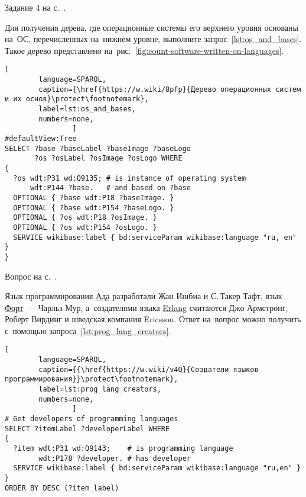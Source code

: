 \newpage
\begin{task}
\label{answer:os_and_bases}
    \AnswerBackref Задание 4 на с.~\pageref{tasks:operating_system_tasks}.

    Для получения дерева, где операционные системы его верхнего уровня  
    основаны на~ОС, перечисленных на~нижнем уровне, выполните запрос~\ref{lst:os_and_bases}. 
    Такое дерево представлено на~рис.~\ref{fig:count-software-written-on-languages}.

\begin{lstlisting}[ 
        language=SPARQL, 
        caption={\href{https://w.wiki/8pfp}{Дерево операционных систем и их основ}\protect\footnotemark},
        label=lst:os_and_bases,
        numbers=none,
	            ]
#defaultView:Tree
SELECT ?base ?baseLabel ?baseImage ?baseLogo
       ?os ?osLabel ?osImage ?osLogo WHERE 
{
  ?os wdt:P31 wd:Q9135; # is instance of operating system
      wdt:P144 ?base.   # and based on ?base
  OPTIONAL { ?base wdt:P18 ?baseImage. }
  OPTIONAL { ?base wdt:P154 ?baseLogo. }
  OPTIONAL { ?os wdt:P18 ?osImage. }
  OPTIONAL { ?os wdt:P154 ?osLogo. }
  SERVICE wikibase:label { bd:serviceParam wikibase:language "ru, en" }
}
\end{lstlisting}
\end{task}




\hfil{}\hfil%

\begin{task}
    \label{answer:prog_lang_1}
    \AnswerBackref Вопрос на с.~\pageref{question:prog_lang_1}.

    Язык программирования \href{https://ru.wikipedia.org/?curid=4500}{Ада} 
    разработали Жан Ишбиа и С.\,Такер Тафт, 
    язык \href{https://ru.wikipedia.org/?curid=11379}{Форт}~--- Чарльз Мур, 
    а~создателями языка \href{https://ru.wikipedia.org/wiki/Erlang}{Erlang} считаются Джо Армстронг, Роберт Вирдинг 
    и шведская компания Ericsson. 
    Ответ на~вопрос можно получить с~помощью запроса~\ref{lst:prog_lang_creators}. 

\begin{lstlisting}[
        language=SPARQL, 
        caption={{\href{https://w.wiki/v4Q}{Создатели языков программирования}}\protect\footnotemark}, 
        label=lst:prog_lang_creators,
        numbers=none,
                ]
# Get developers of programming languages
SELECT ?itemLabel ?developerLabel WHERE 
{
  ?item wdt:P31 wd:Q9143;    # is programming language
        wdt:P178 ?developer. # has developer
  SERVICE wikibase:label { bd:serviceParam wikibase:language "ru,en" }
}
ORDER BY DESC (?item_label)
\end{lstlisting}
\end{task}



